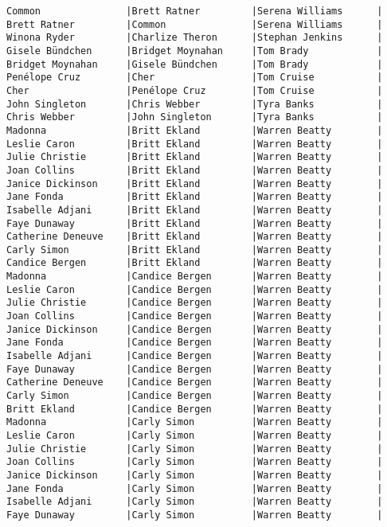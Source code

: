 \documentclass{article}
\begin{document}
\begin{verbatim}
Common               |Brett Ratner         |Serena Williams      |
Brett Ratner         |Common               |Serena Williams      |
Winona Ryder         |Charlize Theron      |Stephan Jenkins      |
Gisele Bündchen      |Bridget Moynahan     |Tom Brady            |
Bridget Moynahan     |Gisele Bündchen      |Tom Brady            |
Penélope Cruz        |Cher                 |Tom Cruise           |
Cher                 |Penélope Cruz        |Tom Cruise           |
John Singleton       |Chris Webber         |Tyra Banks           |
Chris Webber         |John Singleton       |Tyra Banks           |
Madonna              |Britt Ekland         |Warren Beatty        |
Leslie Caron         |Britt Ekland         |Warren Beatty        |
Julie Christie       |Britt Ekland         |Warren Beatty        |
Joan Collins         |Britt Ekland         |Warren Beatty        |
Janice Dickinson     |Britt Ekland         |Warren Beatty        |
Jane Fonda           |Britt Ekland         |Warren Beatty        |
Isabelle Adjani      |Britt Ekland         |Warren Beatty        |
Faye Dunaway         |Britt Ekland         |Warren Beatty        |
Catherine Deneuve    |Britt Ekland         |Warren Beatty        |
Carly Simon          |Britt Ekland         |Warren Beatty        |
Candice Bergen       |Britt Ekland         |Warren Beatty        |
Madonna              |Candice Bergen       |Warren Beatty        |
Leslie Caron         |Candice Bergen       |Warren Beatty        |
Julie Christie       |Candice Bergen       |Warren Beatty        |
Joan Collins         |Candice Bergen       |Warren Beatty        |
Janice Dickinson     |Candice Bergen       |Warren Beatty        |
Jane Fonda           |Candice Bergen       |Warren Beatty        |
Isabelle Adjani      |Candice Bergen       |Warren Beatty        |
Faye Dunaway         |Candice Bergen       |Warren Beatty        |
Catherine Deneuve    |Candice Bergen       |Warren Beatty        |
Carly Simon          |Candice Bergen       |Warren Beatty        |
Britt Ekland         |Candice Bergen       |Warren Beatty        |
Madonna              |Carly Simon          |Warren Beatty        |
Leslie Caron         |Carly Simon          |Warren Beatty        |
Julie Christie       |Carly Simon          |Warren Beatty        |
Joan Collins         |Carly Simon          |Warren Beatty        |
Janice Dickinson     |Carly Simon          |Warren Beatty        |
Jane Fonda           |Carly Simon          |Warren Beatty        |
Isabelle Adjani      |Carly Simon          |Warren Beatty        |
Faye Dunaway         |Carly Simon          |Warren Beatty        |

\end{verbatim}
\end{document}
